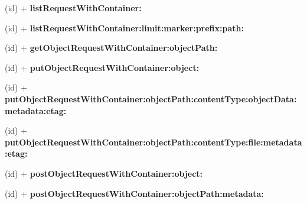 \begin{DoxyCompactItemize}
\item 
\hypertarget{interface_a_s_i_cloud_files_object_request_ad140f7f65fef97218ff5a8853afbc0c7}{
(id) + {\bfseries list\-Request\-With\-Container\-:}}
\label{interface_a_s_i_cloud_files_object_request_ad140f7f65fef97218ff5a8853afbc0c7}

\item 
\hypertarget{interface_a_s_i_cloud_files_object_request_a67e5f2848052dcdf80aac2ffd4f64525}{
(id) + {\bfseries list\-Request\-With\-Container\-:limit\-:marker\-:prefix\-:path\-:}}
\label{interface_a_s_i_cloud_files_object_request_a67e5f2848052dcdf80aac2ffd4f64525}

\item 
\hypertarget{interface_a_s_i_cloud_files_object_request_ac41ac1686f40dd0b25f473b95de56a2b}{
(id) + {\bfseries get\-Object\-Request\-With\-Container\-:object\-Path\-:}}
\label{interface_a_s_i_cloud_files_object_request_ac41ac1686f40dd0b25f473b95de56a2b}

\item 
\hypertarget{interface_a_s_i_cloud_files_object_request_ac9c57b5595d42ea6fdb13b9baa5ad073}{
(id) + {\bfseries put\-Object\-Request\-With\-Container\-:object\-:}}
\label{interface_a_s_i_cloud_files_object_request_ac9c57b5595d42ea6fdb13b9baa5ad073}

\item 
\hypertarget{interface_a_s_i_cloud_files_object_request_a51fd51b32cb64756aa6fbc3f50ff7df4}{
(id) + {\bfseries put\-Object\-Request\-With\-Container\-:object\-Path\-:content\-Type\-:object\-Data\-:metadata\-:etag\-:}}
\label{interface_a_s_i_cloud_files_object_request_a51fd51b32cb64756aa6fbc3f50ff7df4}

\item 
\hypertarget{interface_a_s_i_cloud_files_object_request_a4fd2c82bc1702341d5a482f7ff46db4b}{
(id) + {\bfseries put\-Object\-Request\-With\-Container\-:object\-Path\-:content\-Type\-:file\-:metadata\-:etag\-:}}
\label{interface_a_s_i_cloud_files_object_request_a4fd2c82bc1702341d5a482f7ff46db4b}

\item 
\hypertarget{interface_a_s_i_cloud_files_object_request_ae713a0e0f7867895b33210be74770c47}{
(id) + {\bfseries post\-Object\-Request\-With\-Container\-:object\-:}}
\label{interface_a_s_i_cloud_files_object_request_ae713a0e0f7867895b33210be74770c47}

\item 
\hypertarget{interface_a_s_i_cloud_files_object_request_a594d1d7c8fc812dc9acc2c862809b603}{
(id) + {\bfseries post\-Object\-Request\-With\-Container\-:object\-Path\-:metadata\-:}}
\label{interface_a_s_i_cloud_files_object_request_a594d1d7c8fc812dc9acc2c862809b603}


\end{DoxyCompactItemize}
